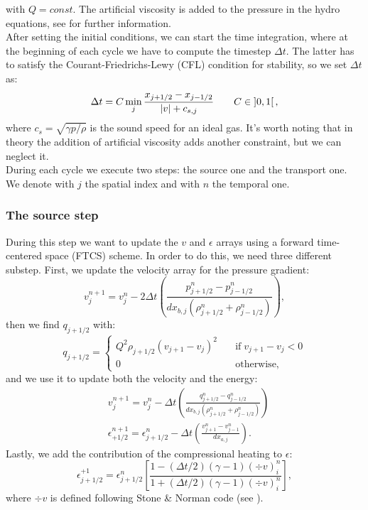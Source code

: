 \documentclass{article}
\begin{document}
with $Q=const$. The artificial viscosity is added to the pressure in the hydro equations, see \cite{vonneuman} for further information.\\
After setting the initial conditions, we can start the time integration, where at the beginning of each cycle we have to compute the timestep $\Delta t$. The latter has to satisfy the Courant-Friedrichs-Lewy (CFL) condition for stability, so we set $\Delta t$ as:
\begin{equation}\label{timeeq}
	\Delta t=C\min_{j}{\frac{x_{j+1/2}-x_{j-1/2}}{\abs{v}+c_{s,j}}} \qquad C\in \left]0,1\right[,
\end{equation}
where $c_s=\sqrt{\gamma p/\rho}$ is the sound speed for an ideal gas. It's worth noting that in theory the addition of artificial viscosity adds another constraint, but we can neglect it. \\
During each cycle we execute two steps: the source one and the transport one. We denote with $j$ the spatial index and with $n$ the temporal one.
\subsubsection{The source step}
During this step we want to update the $v$ and $\epsilon$ arrays using a forward time-centered space (FTCS) scheme. In order to do this, we need three different substep. First, we update the velocity array for the pressure gradient:
\begin{equation}
	v_{j}^{n+1}=v_{j}^n-2\Delta t\left(\frac{p_{j+1/2}^n-p_{j-1/2}^n}{dx_{b,j}(\rho_{j+1/2}^n+\rho_{j-1/2}^n)}\right),
\end{equation}
then we find $q_{j+1/2}$ with:
\begin{equation}
	q_{j+1/2}=
	\begin{cases}
		Q^{2}\rho_{j+1/2}(v_{j+1}-v_j)^2 \quad &\text{if} \; v_{j+1}-v_j<0\\
		0 \quad &\text{otherwise},
	\end{cases}
\end{equation}
and we use it to update both the velocity and the energy:
\begin{align}
	&v_j^{n+1}=v_j^n-\Delta t\left(\frac{q_{j+1/2}^n-q_{j-1/2}^n}{dx_{b,j}(\rho_{j+1/2}^n+\rho_{j-1/2}^n)}\right)\\
	&\epsilon_{+1/2}^{n+1}=\epsilon_{j+1/2}^n-\Delta t\left(\frac{v_{j+1}^n-v_{j-1}^n}{dx_{a,j}}\right).
\end{align}
Lastly, we add the contribution of the compressional heating to $\epsilon$:
\begin{equation}
	\epsilon^{+1}_{j+1/2}=\epsilon^n_{j+1/2}\left[\frac{1-(\Delta t/2)(\gamma -1)(\div{v})_i^n}{1+(\Delta t/2)(\gamma -1)(\div{v})_i^n}\right],
\end{equation}
where $\div{v}$ is defined following Stone \& Norman code (see \cite{stone}).
\end{document}
